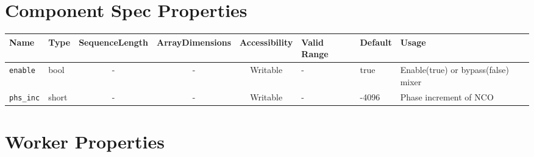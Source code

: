\begin{landscape}
	\section*{Component Spec Properties}
	\begin{scriptsize}
		\begin{tabular}{|p{3cm}|p{1.5cm}|c|c|c|p{1.5cm}|p{1cm}|p{7cm}|}
			\hline
			\rowcolor{blue}
			Name               & Type   & SequenceLength & ArrayDimensions & Accessibility	& Valid Range	& Default 	& Usage\\
			\hline
			\verb+enable+      & bool   & -              & -               & Writable			& -				& true    	& Enable(true) or bypass(false) mixer\\
			\hline
			\verb+phs_inc+     & short  & -              & -               & Writable			& -				& -4096		& Phase increment of NCO\\
			\hline
		\end{tabular}
	\end{scriptsize}

	\section*{Worker Properties}

\end{landscape}
